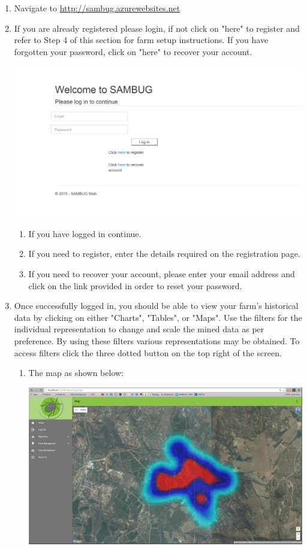 \documentclass[11pt,a4paper,titlepage]{article}
\begin{document}
	\begin{enumerate}
		\item Navigate to \url{http://sambug.azurewebsites.net}
		\item If you are already registered please login, if not click on "here" to register and refer to Step 4 of this section for farm setup instructions. If you have forgotten your password, click on "here" to recover your account.  %
	\begin{center}
		\includegraphics[scale=0.7]{login_page.png}
	\end{center}
		\begin{enumerate}
			\item If you have logged in continue.
			\item If you need to register, enter the details required on the registration page.
			\item If you need to recover your account, please enter your email address and click on the link provided in order to reset your password.
		\end{enumerate}
\item Once successfully logged in, you should be able to view your farm's historical data by clicking on either "Charts", "Tables", or "Maps". Use the filters for the individual representation to change and scale the mined data as per preference. By using these filters various representations may be obtained. To access filters click the three dotted button on the top right of the screen.
		\begin{enumerate}
			\item The map as shown below:
			\begin{center}
				\includegraphics[width=\linewidth]{map.png}

\end{center}
\end{enumerate}
\end{enumerate}
\end{document}
